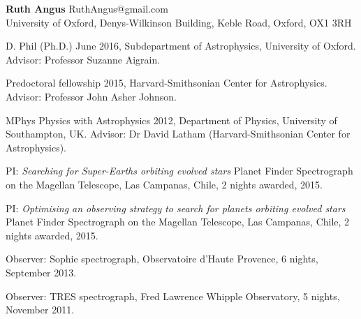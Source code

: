 \documentclass[12pt,letterpaper]{article}
\begin{document}
\thispagestyle{empty}\sloppy\sloppypar\raggedbottom

\textbf{\Large Ruth Angus} \hfill
\textsf{\small RuthAngus@gmail.com} \\[0.5ex]
University of Oxford, Denys-Wilkinson Building, Keble Road, Oxford, OX1
3RH\\[0.5ex]

\begin{list}{}{\cvlist}
\item
D. Phil (Ph.D.) June 2016, Subdepartment of Astrophysics, University of
Oxford.
Advisor: Professor Suzanne Aigrain.
\item
Predoctoral fellowship 2015, Harvard-Smithsonian Center for Astrophysics.
Advisor: Professor John Asher Johnson.
\item
MPhys Physics with Astrophysics 2012, Department of Physics, University of
Southampton, UK. Advisor: Dr David Latham (Harvard-Smithsonian Center for
Astrophysics).
\end{list}


\begin{list}{}{\cvlist}
\item
PI: {\it Searching for Super-Earths orbiting evolved stars} Planet Finder
Spectrograph on the Magellan Telescope, Las Campanas, Chile, 2 nights awarded,
2015.
\item
PI: {\it Optimising an observing strategy to search for planets orbiting
evolved stars} Planet Finder Spectrograph on the Magellan Telescope, Las
Campanas, Chile, 2 nights awarded, 2015.
\item
Observer: Sophie spectrograph, Observatoire d'Haute Provence, 6 nights,
September 2013.
\item
Observer: TRES spectrograph, Fred Lawrence Whipple Observatory, 5 nights,
November 2011.
\end{list}
\end{document}
